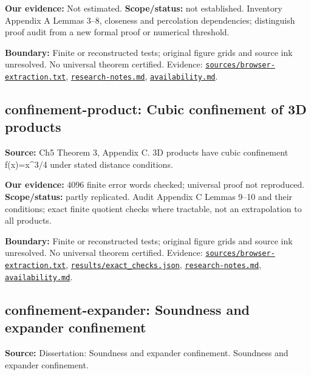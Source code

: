 \documentclass[11pt]{article}
\begin{document}
\textbf{Our evidence:} Not estimated. \textbf{Scope/status:} not established. Inventory Appendix A Lemmas 3--8, closeness and percolation dependencies; distinguish proof audit from a new formal proof or numerical threshold.

\textbf{Boundary:} Finite or reconstructed tests; original figure grids and source ink unresolved. No universal theorem certified. Evidence: \href{https://github.com/alectionary/vibe-math/blob/master/formalization/quintavalle-hgp/sources/browser-extraction.txt}{\nolinkurl{sources/browser-extraction.txt}}, \href{https://github.com/alectionary/vibe-math/blob/master/formalization/quintavalle-hgp/research-notes.md}{\nolinkurl{research-notes.md}}, \href{https://github.com/alectionary/vibe-math/blob/master/formalization/quintavalle-hgp/availability.md}{\nolinkurl{availability.md}}.
\subsection{confinement-product: Cubic confinement of 3D products}
\label{claim:confinement-product}
\textbf{Source:} Ch5 Theorem 3, Appendix C. 3D products have cubic confinement f(x)=x\textasciicircum{}3/4 under stated distance conditions.

\textbf{Our evidence:} 4096 finite error words checked; universal proof not reproduced. \textbf{Scope/status:} partly replicated. Audit Appendix C Lemmas 9--10 and their conditions; exact finite quotient checks where tractable, not an extrapolation to all products.

\textbf{Boundary:} Finite or reconstructed tests; original figure grids and source ink unresolved. No universal theorem certified. Evidence: \href{https://github.com/alectionary/vibe-math/blob/master/formalization/quintavalle-hgp/sources/browser-extraction.txt}{\nolinkurl{sources/browser-extraction.txt}}, \href{https://github.com/alectionary/vibe-math/blob/master/formalization/quintavalle-hgp/results/exact_checks.json}{\nolinkurl{results/exact_checks.json}}, \href{https://github.com/alectionary/vibe-math/blob/master/formalization/quintavalle-hgp/research-notes.md}{\nolinkurl{research-notes.md}}, \href{https://github.com/alectionary/vibe-math/blob/master/formalization/quintavalle-hgp/availability.md}{\nolinkurl{availability.md}}.
\subsection{confinement-expander: Soundness and expander confinement}
\label{claim:confinement-expander}
\textbf{Source:} Dissertation: Soundness and expander confinement. Soundness and expander confinement.
\end{document}
